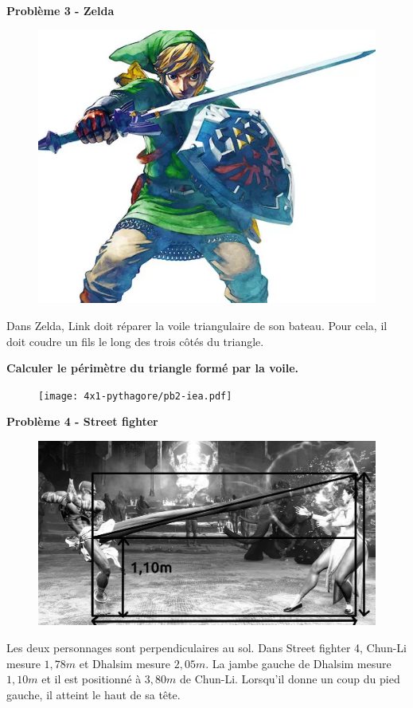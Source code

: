 \begin{multicols}{2} 
  \textbf{Problème 3 - Zelda} \\

  \begin{figure}[H]
    \centering
    \includegraphics[width=0.5\linewidth]{4x1-pythagore/pb1-link.png}
  \end{figure}

  Dans Zelda, Link doit réparer la voile triangulaire de son bateau. Pour cela, il doit coudre un fils le long des trois côtés du triangle. 

  \textbf{Calculer le périmètre du triangle formé par la voile.} \columnbreak

  \begin{figure}[H]
    \centering
    \texttt{[image: 4x1-pythagore/pb2-iea.pdf]}
  \end{figure}

\end{multicols}


\textbf{Problème 4 - Street fighter} \\

\begin{figure}[H]
  \centering
  \includegraphics[width=0.5\linewidth]{4x1-pythagore/sf4.jpg}
\end{figure}

Les deux personnages sont perpendiculaires au sol. Dans Street fighter 4, Chun-Li mesure $1,78m$ et Dhalsim mesure $2,05m$. La jambe gauche de Dhalsim mesure $1,10m$ et il est positionné à $3,80m$ de Chun-Li. Lorsqu'il donne un coup du pied gauche, il atteint le haut de sa tête. 


